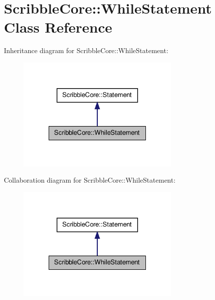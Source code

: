\hypertarget{class_scribble_core_1_1_while_statement}{\section{Scribble\-Core\-:\-:While\-Statement Class Reference}
\label{class_scribble_core_1_1_while_statement}
}


Inheritance diagram for Scribble\-Core\-:\-:While\-Statement\-:\nopagebreak
\begin{figure}[H]
\begin{center}
\leavevmode
\includegraphics[width=228pt]{class_scribble_core_1_1_while_statement__inherit__graph}
\end{center}
\end{figure}


Collaboration diagram for Scribble\-Core\-:\-:While\-Statement\-:\nopagebreak
\begin{figure}[H]
\begin{center}
\leavevmode
\includegraphics[width=228pt]{class_scribble_core_1_1_while_statement__coll__graph}
\end{center}
\end{figure}

